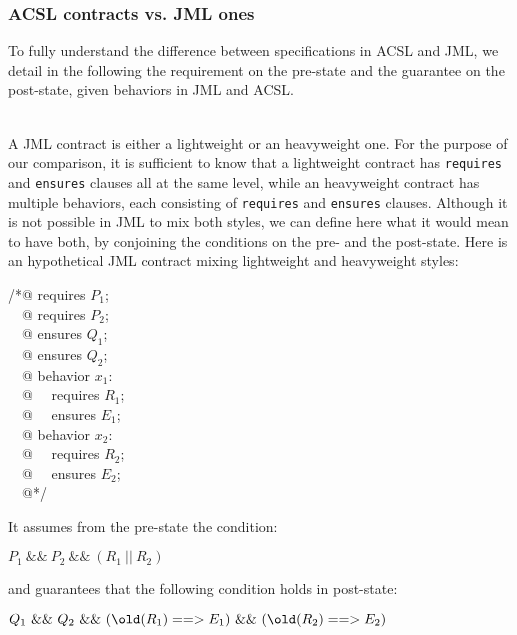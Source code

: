 \subsubsection*{ACSL contracts vs. JML ones}

To fully understand the difference between specifications in ACSL and
JML, we detail in the following the requirement on the pre-state and
the guarantee on the post-state, given behaviors in JML and ACSL.

~\\
\noindent
A JML contract is either a lightweight or an heavyweight one.
For the purpose of our comparison, it is sufficient to know that a
lightweight contract has \verb|requires| and \verb|ensures| clauses
all at the same level, while an heavyweight contract has multiple
behaviors, each consisting of \verb|requires| and \verb|ensures|
clauses. Although it is not possible in JML to mix both styles, we can
define here what it would mean to have both, by conjoining the
conditions on the pre- and the post-state.
Here is an hypothetical JML contract mixing lightweight and
heavyweight styles:

\begin{flushleft}\ttfamily
/*@ requires $P_1$; \\
~~@ requires $P_2$; \\
~~@ ensures  $Q_1$; \\
~~@ ensures  $Q_2$; \\
~~@ behavior $x_1$: \\
~~@ ~~requires $R_1$; \\
~~@ ~~ensures $E_1$; \\
~~@ behavior $x_2$: \\
~~@ ~~requires $R_2$; \\
~~@ ~~ensures $E_2$; \\
~~@*/
\end{flushleft}

\noindent
It assumes from the pre-state the condition:

\begin{center}
{\ttfamily $P_1 ~\&\&~ P_2 ~\&\&~ (R_1 ~||~ R_2)$}
\end{center}

\noindent
and guarantees that the following condition holds in post-state:

\begin{center}
{\ttfamily $Q_1 ~\&\&~ Q_2 ~\&\&~ 
  (\texttt{{\textbackslash}old}(R_1) ==> E_1) ~\&\&~ (\texttt{{\textbackslash}old}(R_2) ==> E_2)$}
\end{center}

